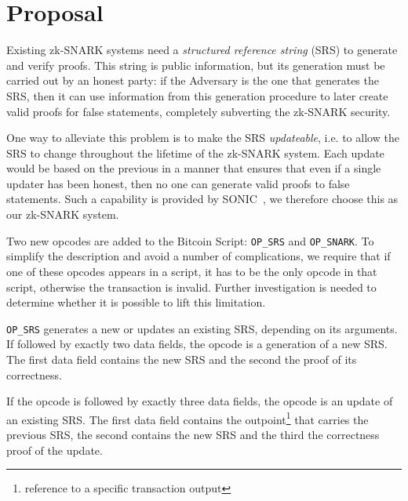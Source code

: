 \section{Proposal}
  Existing zk-SNARK systems need a \emph{structured reference string} (SRS) to
  generate and verify proofs. This string is public information, but its
  generation must be carried out by an honest party: if the Adversary is the one
  that generates the SRS, then it can use information from this generation
  procedure to later create valid proofs for false statements, completely
  subverting the zk-SNARK security.

  One way to alleviate this problem is to make the SRS \emph{updateable}, i.e.
  to allow the SRS to change throughout the lifetime of the zk-SNARK system.
  Each update would be based on the previous in a manner that ensures that even
  if a single updater has been honest, then no one can generate valid proofs to
  false statements. Such a capability is provided by
  SONIC~\cite{DBLP:conf/ccs/MallerBKM19}, we therefore choose this as our
  zk-SNARK system.

  Two new opcodes are added to the Bitcoin Script: \texttt{OP\_SRS} and
  \texttt{OP\_SNARK}. To simplify the description and avoid a number of
  complications, we require that if one of these opcodes appears in a script, it
  has to be the only opcode in that script, otherwise the transaction is
  invalid. Further investigation is needed to determine whether it is possible
  to lift this limitation.

  \texttt{OP\_SRS} generates a new or updates an existing SRS, depending on its
  arguments. If followed by exactly two data fields, the opcode is a generation
  of a new SRS. The first data field contains the new SRS and the second the
  proof of its correctness.

  If the opcode is followed by exactly three data fields, the opcode is an
  update of an existing SRS. The first data field contains the
  outpoint\footnote{reference to a specific transaction output} that carries the
  previous SRS, the second contains the new SRS and the third the correctness
  proof of the update.


